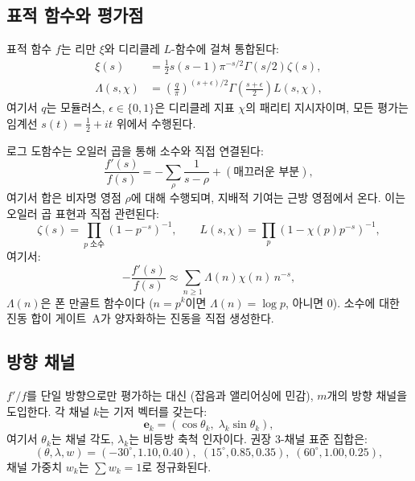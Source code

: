 \documentclass[11pt, a4paper]{article}
\theoremstyle{definition}
\theoremstyle{plain}
\newcommand{\xif}{\xi}
\begin{document}
\subsection{표적 함수와 평가점}

표적 함수 $f$는 리만 $\xif$와 디리클레 $L$-함수에 걸쳐 통합된다:
\begin{align}
  \xif(s) &= \frac{1}{2}s(s-1)\pi^{-s/2}\Gamma(s/2)\zeta(s),
  \label{eq:xi_target}\\
  \Lambda(s, \chi) &= \left(\frac{q}{\pi}\right)^{(s+\epsilon)/2}
  \Gamma\!\left(\frac{s+\epsilon}{2}\right)L(s,\chi),
  \label{eq:lambda_target}
\end{align}
여기서 $q$는 모듈러스, $\epsilon \in \{0,1\}$은 디리클레 지표 $\chi$의 패리티 지시자이며, 모든 평가는 임계선 $s(t) = \tfrac{1}{2} + it$ 위에서 수행된다.

로그 도함수는 오일러 곱을 통해 소수와 직접 연결된다:
\begin{equation}
  \frac{f'(s)}{f(s)} = -\sum_{\rho}\frac{1}{s-\rho} +
  (\text{매끄러운 부분}),
  \label{eq:log_deriv_poles}
\end{equation}
여기서 합은 비자명 영점 $\rho$에 대해 수행되며, 지배적 기여는 근방 영점에서 온다. 이는 오일러 곱 표현과 직접 관련된다:
\begin{equation}
  \zeta(s) = \prod_{p\;\text{소수}}(1-p^{-s})^{-1}, \qquad
  L(s,\chi) = \prod_p(1-\chi(p)p^{-s})^{-1},
  \label{eq:euler_products}
\end{equation}
여기서:
\begin{equation}
  -\frac{f'(s)}{f(s)} \approx \sum_{n \geq 1}
  \Lambda(n)\chi(n)\,n^{-s},
  \label{eq:euler_log_deriv}
\end{equation}
$\Lambda(n)$은 폰 만골트 함수이다 ($n = p^k$이면 $\Lambda(n) = \log p$, 아니면 $0$). 소수에 대한 진동 합이 게이트~A가 양자화하는 진동을 직접 생성한다.


\subsection{방향 채널}
\label{sec:channels}

$f'/f$를 단일 방향으로만 평가하는 대신 (잡음과 앨리어싱에 민감), $m$개의 방향 채널을 도입한다. 각 채널 $k$는 기저 벡터를 갖는다:
\begin{equation}
  \mathbf{e}_k = (\cos\theta_k, \;\lambda_k\sin\theta_k),
  \label{eq:channel_vector}
\end{equation}
여기서 $\theta_k$는 채널 각도, $\lambda_k$는 비등방 축척 인자이다. 권장 3-채널 표준 집합은:
\begin{equation}
  (\theta, \lambda, w) = (-30^\circ, 1.10, 0.40), \;
  (15^\circ, 0.85, 0.35), \;
  (60^\circ, 1.00, 0.25),
  \label{eq:channel_set}
\end{equation}
채널 가중치 $w_k$는 $\sum w_k = 1$로 정규화된다.
\end{document}
